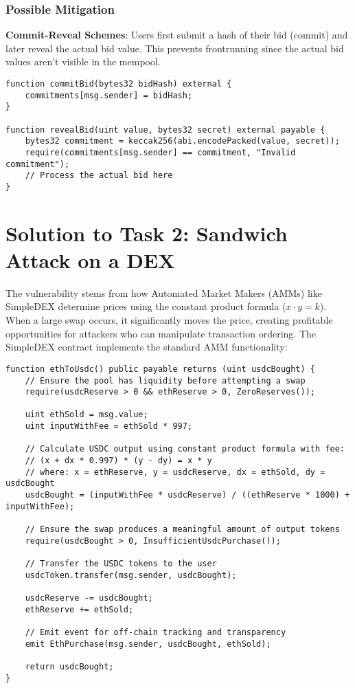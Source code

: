 \documentclass[12pt]{article}
\begin{document}
\subsubsection*{Possible Mitigation}

\textbf{Commit-Reveal Schemes}: Users first submit a hash of their bid (commit) and later reveal the actual bid value. This prevents frontrunning since the actual bid values aren't visible in the mempool.

\noindent
\begin{minipage}{\textwidth}
\begin{lstlisting}[language=Solidity]
function commitBid(bytes32 bidHash) external {
    commitments[msg.sender] = bidHash;
}

function revealBid(uint value, bytes32 secret) external payable {
    bytes32 commitment = keccak256(abi.encodePacked(value, secret));
    require(commitments[msg.sender] == commitment, "Invalid commitment");
    // Process the actual bid here
}
\end{lstlisting}
\end{minipage}

\section*{Solution to Task 2: Sandwich Attack on a DEX}

The vulnerability stems from how Automated Market Makers (AMMs) like SimpleDEX determine prices using the constant product formula ($x \cdot y = k$). When a large swap occurs, it significantly moves the price, creating profitable opportunities for attackers who can manipulate transaction ordering. The SimpleDEX contract implements the standard AMM functionality:

\noindent
\begin{minipage}{\textwidth}
\begin{lstlisting}[language=Solidity]
function ethToUsdc() public payable returns (uint usdcBought) {
    // Ensure the pool has liquidity before attempting a swap
    require(usdcReserve > 0 && ethReserve > 0, ZeroReserves());

    uint ethSold = msg.value;
    uint inputWithFee = ethSold * 997;

    // Calculate USDC output using constant product formula with fee: 
    // (x + dx * 0.997) * (y - dy) = x * y
    // where: x = ethReserve, y = usdcReserve, dx = ethSold, dy = usdcBought
    usdcBought = (inputWithFee * usdcReserve) / ((ethReserve * 1000) + inputWithFee);

    // Ensure the swap produces a meaningful amount of output tokens
    require(usdcBought > 0, InsufficientUsdcPurchase());

    // Transfer the USDC tokens to the user
    usdcToken.transfer(msg.sender, usdcBought);

    usdcReserve -= usdcBought;
    ethReserve += ethSold;

    // Emit event for off-chain tracking and transparency
    emit EthPurchase(msg.sender, usdcBought, ethSold);

    return usdcBought;
}
\end{lstlisting}
\end{minipage}
\end{document}
